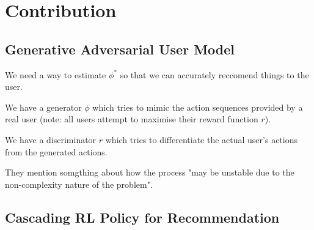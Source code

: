 \documentclass{article}
\begin{document}
    \section{Contribution}

    \subsection{Generative Adversarial User Model}
    We need a way to estimate $\phi ^*$ so that we can accurately reccomend things to the user.

    We have a generator $\phi$ which tries to mimic the action sequences provided by a real user (note: all users attempt to maximise their reward function $r$).

    We have a discriminator $r$ which tries to differentiate the actual user's actions from the generated actions.

    

    They mention somgthing about how the process "may be unstable due to the non-complexity nature of the problem". 

    \subsection{Cascading RL Policy for Recommendation}
\end{document}

